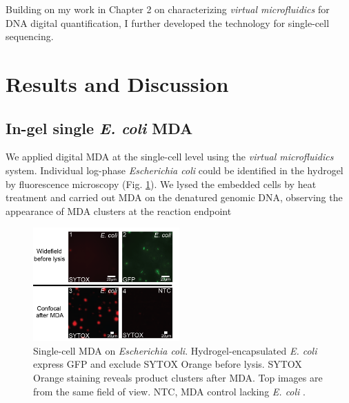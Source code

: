 Building on my work in Chapter 2 on characterizing \textit{virtual microfluidics} for DNA digital quantification, I further developed the technology for single-cell sequencing. 

\section{Results and Discussion}
\subsection{In-gel single \textit{E. coli} MDA}
We applied digital MDA at the single-cell level using the \textit{virtual microfluidics} system. Individual log-phase \textit{Escherichia coli} could be identified in the hydrogel by fluorescence microscopy (Fig. \ref{fig:EcoliMDA}). We lysed the embedded cells by heat treatment and carried out MDA on the denatured genomic DNA, observing the appearance of MDA clusters at the reaction endpoint 

\begin{figure}
\centering
\includegraphics[keepaspectratio,width=0.5\textwidth]{./figures/Thesis-22.png}
\caption[Single-cell MDA on \textit{Escherichia coli}]{Single-cell MDA on \textit{Escherichia coli}. Hydrogel-encapsulated \textit{E. coli}  express GFP and exclude SYTOX Orange before lysis. SYTOX Orange staining reveals product clusters after MDA. Top images are from the same field of view. NTC, MDA control lacking \textit{E. coli} .}
\label{fig:EcoliMDA}
\end{figure}

